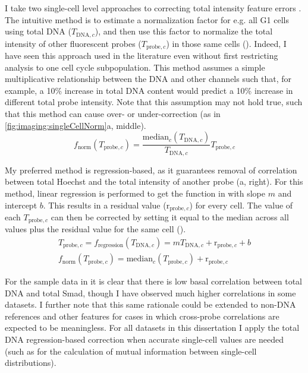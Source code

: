 I take two single-cell level approaches to correcting
total intensity feature errors
. The intuitive method
is to estimate a normalization factor for e.g. all G1 cells
using total DNA ($T_{\text{DNA},c}$), and then use this
factor to normalize the total intensity of other
fluorescent probes ($T_{\text{probe},c}$)
in those same cells (). Indeed,
I have seen this approach used in the literature even
without first restricting analysis to one cell cycle
subpopulation. This
method assumes a simple multiplicative relationship
between the DNA and other channels such that, for example, a 10\%
increase in total DNA content would predict a 10\%
increase in different total probe intensity. Note
that this assumption may not hold true, such that this
method can cause over- or under-correction (as in
\ref{fig:imaging:singleCellNorm}a, middle).
    \begin{equation} \label{eq:imaging:dnaNorm}
    f_{\text{norm}}(T_{\text{probe},c})=
    \frac{\text{median}_c(T_{\text{DNA},c})}{T_{\text{DNA},c}}T_{\text{probe},c}
    \end{equation}

    
My preferred method is regression-based, as it
guarantees removal of
correlation between total Hoechst and the total intensity of
another probe (a, right).
For this method, linear regression is performed to get the
function in  with slope $m$ and intercept $b$.
This results in a residual value ($\text{r}_{\text{probe},c}$)
for every cell.
The value of each $T_{\text{probe},c}$ can then be corrected
by setting it equal to the median across all values plus the residual
value for the same cell ().
    \begin{gather}
    T_{\text{probe},c}=f_\text{regression}(T_{\text{DNA},c})=mT_{\text{DNA},c}+\text{r}_{\text{probe},c}+b
        \label{eq:imaging:reg}\\
    f_\text{norm}(T_{\text{probe},c}) =
        \text{median}_c(T_{\text{probe},c})+\text{r}_{\text{probe},c}
        \label{eq:imaging:regNorm}
    \end{gather}

    
For the sample data in  it is
clear that there is low basal correlation between total DNA
and total Smad, though I have observed much
higher correlations in some datasets. I further note that this same rationale
could be extended to non-DNA references and other features
for cases in which cross-probe
correlations are expected to be meaningless.
For all datasets in this dissertation I
apply the total DNA regression-based correction when accurate
single-cell values are needed (such as for the calculation of mutual
information between single-cell distributions).


